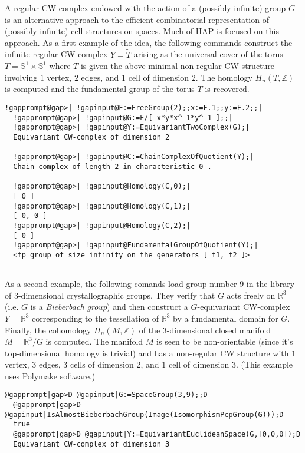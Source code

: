 \documentclass[a4paper,11pt]{report}
\begin{document}
{{A regular CW-complex endowed with the action of a (possibly infinite) group $G$ is an alternative approach to the efficient combinatorial representation of
(possibly infinite) cell structures on spaces. Much of \textsc{HAP} is focused on this approach. As a first example of the idea, the following
commands construct the infinite regular CW-complex $Y=\widetilde T$ arising as the universal cover of the torus $T=\mathbb S^1\times \mathbb S^1$ where $T$ is given the above minimal non-regular CW structure involving $1$ vertex, $2$ edges, and $1$ cell of dimension $2$. The homology $H_n(T,\mathbb Z)$ is computed and the fundamental group of the torus $T$ is recovered. 
\begin{Verbatim}[commandchars=!@|,fontsize=\small,frame=single,label=Example]
  !gapprompt@gap>| !gapinput@F:=FreeGroup(2);;x:=F.1;;y:=F.2;;|
  !gapprompt@gap>| !gapinput@G:=F/[ x*y*x^-1*y^-1 ];;|
  !gapprompt@gap>| !gapinput@Y:=EquivariantTwoComplex(G);|
  Equivariant CW-complex of dimension 2
  
  !gapprompt@gap>| !gapinput@C:=ChainComplexOfQuotient(Y);|
  Chain complex of length 2 in characteristic 0 . 
  
  !gapprompt@gap>| !gapinput@Homology(C,0);|
  [ 0 ]
  !gapprompt@gap>| !gapinput@Homology(C,1);|
  [ 0, 0 ]
  !gapprompt@gap>| !gapinput@Homology(C,2);|
  [ 0 ]
  !gapprompt@gap>| !gapinput@FundamentalGroupOfQuotient(Y);|
  <fp group of size infinity on the generators [ f1, f2 ]>
  
\end{Verbatim}
 

As a second example, the following comands load group number $9$ in the library of $3$-dimensional crystallographic groups. They verify that $G$ acts freely on $\mathbb R^3$ (i.e. $G$ is a \emph{Bieberbach group}) and then construct a $G$-equivariant CW-complex $Y=\mathbb R^3$ corresponding to the tessellation of $\mathbb R^3$ by a fundamental domain for $G$. Finally, the cohomology $H_n(M,\mathbb Z)$ of the $3$-dimensional closed manifold $M=\mathbb R^3/G$ is computed. The manifold $M$ is seen to be non-orientable (since it's top-dimensional homology is trivial)
and has a non-regular CW structure with $1$ vertex, $3$ edges, $3$ cells of dimension $2$, and $1$ cell of dimension $3$. (This example uses Polymake software.) 
\begin{Verbatim}[commandchars=@|D,fontsize=\small,frame=single,label=Example]
  @gapprompt|gap>D @gapinput|G:=SpaceGroup(3,9);;D
  @gapprompt|gap>D @gapinput|IsAlmostBieberbachGroup(Image(IsomorphismPcpGroup(G)));D
  true
  @gapprompt|gap>D @gapinput|Y:=EquivariantEuclideanSpace(G,[0,0,0]);D
  Equivariant CW-complex of dimension 3
  

\end{Verbatim}}}
\end{document}

